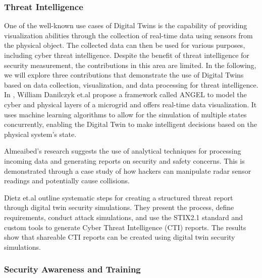 
\subsubsection{Threat Intelligence}

One of the well-known use cases of Digital Twins is the capability of providing visualization abilities through the collection of real-time data using sensors from the physical object. The collected data can then be used for various purposes, including cyber threat intelligence. Despite the benefit of threat intelligence for security measurement, the contributions in this area are limited. In the following, we will explore three contributions that demonstrate the use of Digital Twins based on data collection, visualization, and data processing for threat intelligence.  
In \cite{williamdanilczykANGELIntelligentDigital2019}, William Danilczyk et.al propose a framework called ANGEL to model the cyber and physical layers of a microgrid and offers real-time data visualization. It uses machine learning algorithms to allow for the simulation of multiple states concurrently, enabling the Digital Twin to make intelligent decisions based on the physical system's state.  

Almeaibed's \cite{almeaibedDigitalTwinAnalysis2021} research suggests the use of analytical techniques for processing incoming data and generating reports on security and safety concerns. This is demonstrated through a case study of how hackers can manipulate radar sensor readings and potentially cause collisions.  

Dietz et.al \cite{dietzHarnessingDigitalTwin2022} outline systematic steps for creating a structured threat report through digital twin security simulations. They present the process, define requirements, conduct attack simulations, and use the STIX2.1 standard and custom tools to generate Cyber Threat Intelligence (CTI) reports. The results show that shareable CTI reports can be created using digital twin security simulations.  
\subsubsection{Security Awareness and Training}


